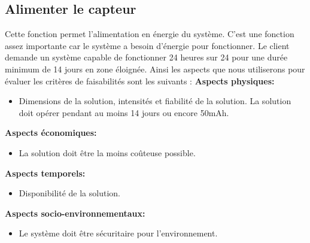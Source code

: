 \begin{table}[!htb]
\footnotesize
\centering
{}
\caption{Faisabilité des concepts pour capter les informations sur les poissons}
\label{t:Decision_capteur}
\end{table}

\subsection{Alimenter le capteur}
 Cette fonction permet l'alimentation en énergie du système. C'est une fonction assez importante car le système a besoin d'énergie pour fonctionner. Le client demande un système capable de fonctionner 24 heures sur 24 pour une durée minimum de 14 jours en zone éloignée. Ainsi les aspects que nous utiliserons pour évaluer les critères de faisabilités sont les suivants : 
 \textbf{Aspects physiques:}
 \begin{itemize} [label = {--}]
    \item Dimensions de la solution, intensités et fiabilité de la solution. La solution doit opérer pendant au moins 14 jours ou encore 50mAh.
\end{itemize}
 \textbf{Aspects économiques:}
 \begin{itemize} [label = {--}]
    \item La solution doit être la moins coûteuse possible.
\end{itemize}
 \textbf{Aspects temporels:}
 \begin{itemize} [label = {--}]
    \item Disponibilité de la solution.
\end{itemize}
 \textbf{Aspects socio-environnementaux:}
 \begin{itemize} [label = {--}]
    \item Le système doit être sécuritaire pour l'environnement.
\end{itemize}
